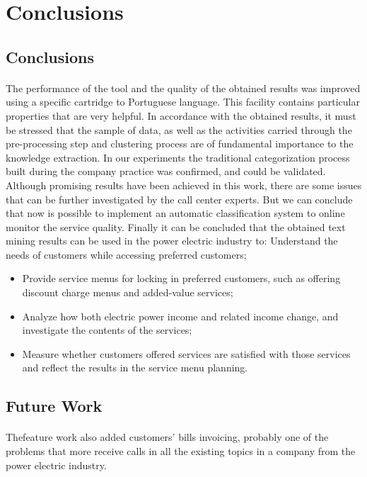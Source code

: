 \section{Conclusions} 
\subsection{Conclusions}
\paragraph{}The performance of the tool and the quality of the obtained results was improved using a specific cartridge to Portuguese language. This facility contains particular properties that are very helpful. In accordance with the obtained results, it must be stressed that the sample of data, as well as the activities carried through the pre-processing step and clustering process are of fundamental importance to the knowledge extraction. In our experiments the traditional categorization process built during the company practice was confirmed, and could be validated. Although promising results have been achieved in this work, there are some issues that can be further investigated by the call center experts. But we can conclude that now is possible to implement an automatic classification system to online monitor the service quality. Finally it can be concluded that the obtained text mining results can be used in the power electric industry to: Understand the needs of customers while accessing preferred customers;
\begin{itemize}
	

\item  Provide service menus for locking in preferred customers, such as offering discount charge menus and added-value services;
\item  Analyze how both electric power income and related income change, and investigate the contents of the services;
\item  Measure whether customers offered services are satisfied with those services and reflect the results in the service menu planning.
\end{itemize}
\subsection{Future Work}
\paragraph{}Thefeature work also added customers’ bills invoicing, probably one of the problems that more receive calls in all the existing topics in a company from the power electric industry.
